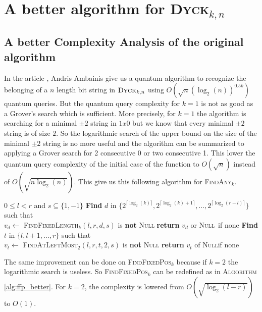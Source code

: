 \documentclass[11pt,a4paper]{article}
\newcommand{\Dyck}[1]{\textsc{Dyck$_{#1}$}}
\newcommand{\FA}[1]{\textsc{FindAny$_{#1}$}}
\newcommand{\FFL}[1]{\textsc{FindFixedLength$_{#1}$}}
\newcommand{\FFP}[1]{\textsc{FindFixedPos$_{#1}$}}
\newcommand{\FALM}[1]{\textsc{FindAtLeftMost$_{#1}$}}
\newcommand{\Null}{\textsc{Null}}
\theoremstyle{definition}
\theoremstyle{plain}
\theoremstyle{definition}
\begin{document}
\section{A better algorithm for \Dyck{k,n}}

\subsection{A better Complexity Analysis of the original algorithm}

In the article \cite{art:2DGrid}, Andris Ambainis give us a quantum algorithm to recognize
the belonging of a $n$ length bit string in $\Dyck{k, n}$ using
$O(\sqrt{n}(\log_2(n))^{0.5k})$ quantum queries. But the quantum query complexity for $k=1$ is not as good as a
Grover's search which is sufficient. More precisely, for $k=1$ the algorithm is
searching for a minimal $\pm 2$ string in $1x0$ but we know that every minimal $\pm 2$ string
is of size $2$. So the logarithmic search of the upper bound on the size of the
minimal $\pm 2$ string is no more useful and the algorithm can be summarized to
applying a Grover search for 2 consecutive 0 or two consecutive 1. This lower the quantum
query complexity of the initial case of the function to $O(\sqrt{n})$ instead of $O(\sqrt{n\log_2(n)})$.
This give us this following algorithm for \FA{k}.

\begin{algorithm}
    \caption{\FA{k}(l,r,s)}\label{alg:FA_prim}
    \begin{algorithmic}
        \Require $0 \leq l < r$ and $s \subseteq \{1,-1\}$
        \State \textbf{Find} $d$ in $\{2^{\lceil \log_2(k)\rceil }, 2^{\lceil \log_2(k)+1\rceil },\ldots,2^{\lceil \log_2(r-l)\rceil }\}$
        such that \\
        \hspace*{1cm} $v_d \gets $ \FFL{k}$(l,r,d,s)$ is \textbf{not} \Null
        \State \textbf{return} $v_d$ or \Null \ if none
        \Else
        \State \textbf{Find} $t$ in $\{l, l+1, \dots, r\}$ such that \\
        \hspace*{1cm} $v_t \gets$ \FALM{2}$(l,r,t,2,s)$ is \textbf{not} \Null
        \State \textbf{return} $v_t$ of \Null if none
        \EndIf
    \end{algorithmic}
\end{algorithm}

The same improvement can be done on \FFP{k} because if $k = 2$ the logarithmic
search is useless. So \FFP{k} can be redefined as in \textsc{Algorithm} \autoref{alg:ffp_better}.
For $k=2$, the complexity is lowered from $O(\sqrt{\log_2(l-r)})$ to $O(1)$.
\end{document}
